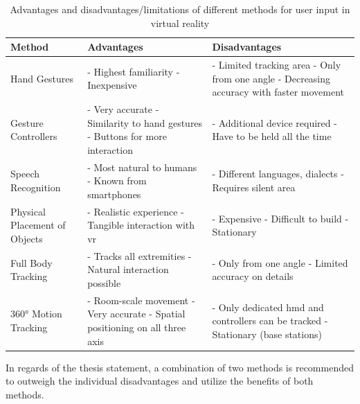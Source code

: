 \begin{table}[h]
	\begin{center}
		\begin{tabular}{ | p{3.7cm} | p{4.9cm} | p{4.9cm} | }
			\hline
			\textbf{Method} & \textbf{Advantages} & \textbf{Disadvantages} \\
			\hline
			Hand Gestures & 
			- Highest familiarity \newline - Inexpensive & 
			- Limited tracking area \newline - Only from one angle \newline - Decreasing accuracy with faster movement  \\
			\hline
			Gesture Controllers &
			- Very accurate \newline - Similarity to hand gestures \newline - Buttons for more interaction &
			- Additional device required \newline - Have to be held all the time \\
			\hline
			Speech Recognition &
			- Most natural to humans \newline - Known from smartphones &
			- Different languages, dialects \newline - Requires silent area \\ 
			\hline
			Physical Placement of Objects &
			- Realistic experience \newline - Tangible interaction with \gls{vr} &
			- Expensive \newline - Difficult to build \newline - Stationary \\ 
			\hline
			Full Body Tracking &
			- Tracks all extremities \newline - Natural interaction possible &
			- Only from one angle \newline - Limited accuracy on details \\ 
			\hline
			360° Motion Tracking &
			- Room-scale movement \newline - Very accurate \newline - Spatial positioning on all three axis &
			- Only dedicated \gls{hmd} and controllers can be tracked \newline - Stationary (base stations) \\ 
			\hline
		\end{tabular}
		\caption{Advantages and disadvantages/limitations of different methods for user input in virtual reality}
		\label{tbl:methodscomparison}
	\end{center}
\end{table} \newline
In regards of the thesis statement, a combination of two methods is recommended to outweigh the individual disadvantages and utilize the benefits of both methods.


